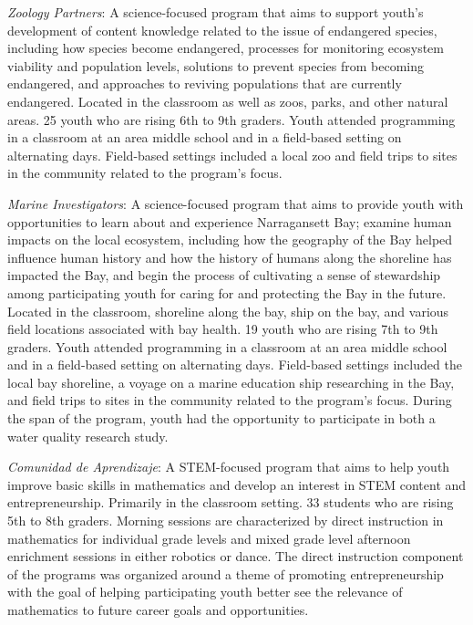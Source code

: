 \documentclass[]{msu-thesis}
\theoremstyle{definition}
\theoremstyle{definition}
\theoremstyle{definition}
\theoremstyle{remark}
\begin{document}
\emph{Zoology Partners}: A science-focused program that aims to support
youth's development of content knowledge related to the issue of
endangered species, including how species become endangered, processes
for monitoring ecosystem viability and population levels, solutions to
prevent species from becoming endangered, and approaches to reviving
populations that are currently endangered. Located in the classroom as
well as zoos, parks, and other natural areas. 25 youth who are rising
6th to 9th graders. Youth attended programming in a classroom at an area
middle school and in a field-based setting on alternating days.
Field-based settings included a local zoo and field trips to sites in
the community related to the program's focus.

\emph{Marine Investigators}: A science-focused program that aims to
provide youth with opportunities to learn about and experience
Narragansett Bay; examine human impacts on the local ecosystem,
including how the geography of the Bay helped influence human history
and how the history of humans along the shoreline has impacted the Bay,
and begin the process of cultivating a sense of stewardship among
participating youth for caring for and protecting the Bay in the future.
Located in the classroom, shoreline along the bay, ship on the bay, and
various field locations associated with bay health. 19 youth who are
rising 7th to 9th graders. Youth attended programming in a classroom at
an area middle school and in a field-based setting on alternating days.
Field-based settings included the local bay shoreline, a voyage on a
marine education ship researching in the Bay, and field trips to sites
in the community related to the program's focus. During the span of the
program, youth had the opportunity to participate in both a water
quality research study.

\emph{Comunidad de Aprendizaje}: A STEM-focused program that aims to
help youth improve basic skills in mathematics and develop an interest
in STEM content and entrepreneurship. Primarily in the classroom
setting. 33 students who are rising 5th to 8th graders. Morning sessions
are characterized by direct instruction in mathematics for individual
grade levels and mixed grade level afternoon enrichment sessions in
either robotics or dance. The direct instruction component of the
programs was organized around a theme of promoting entrepreneurship with
the goal of helping participating youth better see the relevance of
mathematics to future career goals and opportunities.
\end{document}
